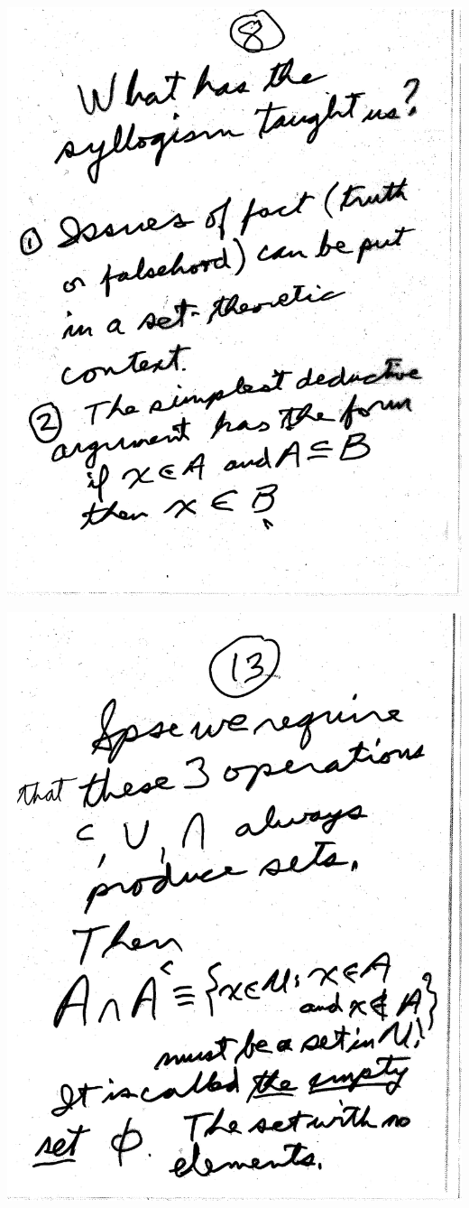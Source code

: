 \documentclass[10pt,a4paper]{article}
\begin{document}
\includegraphics[scale=.5]{Pages/ST_8}




\includegraphics[scale=.5]{Pages/Page_13}
\end{document}
